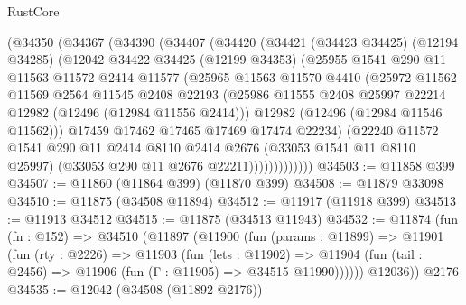 \begin{lexlean}{RustCore}
\begin{coremodule}
          (@34350
            (@34367
              (@34390
                (@34407
                  (@34420
                    (@34421
                      (@34423 @34425)
                      (@12194 @34285)
                      (@12042
                        @34422
                        @34425
                        (@12199 @34353)
                        (@25955
                          @1541
                          @290
                          @11
                          @11563
                          @11572
                          @2414
                          @11577
                          (@25965
                            @11563
                            @11570
                            @4410
                            (@25972
                              @11562
                              @11569
                              @2564
                              @11545
                              @2408
                              @22193
                              (@25986
                                @11555
                                @2408
                                @25997
                                @22214
                                @12982
                                (@12496 (@12984 @11556 @2414)))
                              @12982
                              (@12496 (@12984 @11546 @11562)))
                            @17459
                            @17462
                            @17465
                            @17469
                            @17474
                            @22234)
                          (@22240
                            @11572
                            @1541
                            @290
                            @11
                            @2414
                            @8110
                            @2414
                            @2676
                            (@33053 @1541 @11 @8110 @25997)
                            (@33053 @290 @11 @2676 @22211)))))))))))))
@34503 := @11858 @399
@34507 := @11860 (@11864 @399) (@11870 @399)
@34508 := @11879 @33098
@34510 := @11875 (@34508 @11894)
@34512 := @11917 (@11918 @399)
@34513 := @11913 @34512
@34515 := @11875 (@34513 @11943)
@34532 := @11874
    (fun (fn : @152) =>
    @34510
      (@11897
        (@11900
          (fun (params : @11899) =>
          @11901
            (fun (rty : @2226) =>
            @11903
              (fun (lets : @11902) =>
              @11904 (fun (tail : @2456) => @11906 (fun (Γ : @11905) => @34515 @11990))))))
        @12036))
    @2176
@34535 := @12042 (@34508 (@11892 @2176))

\end{coremodule}
\end{lexlean}
